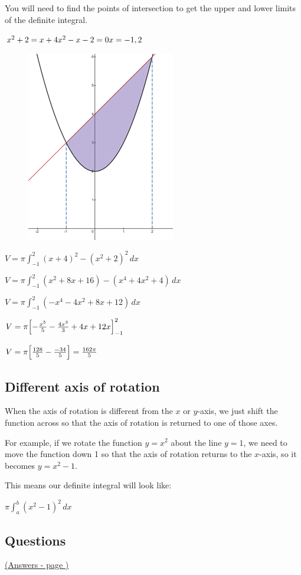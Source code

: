 \documentclass[../main.tex]{subfiles}
\begin{document}
You will need to find the points of intersection to get the upper and lower limits of the definite integral.

$x^2+2=x+4\\
x^2-x-2=0\\
x=-1, 2$

\begin{figure}[h!]
    \centering
    \includegraphics{images/volrev7.png}
\end{figure}

$V=\pi \int_{-1}^2 (x+4)^2 - (x^2+2)^2\,dx$

$V=\pi \int_{-1}^2 (x^2+8x+16) - (x^4+4x^2+4)\,dx$

$V=\pi \int_{-1}^2 (-x^4-4x^2+8x+12)\,dx$

$V=\pi \Bigl[-\frac{x^5}{5}-\frac{4x^3}{3}+4x+12x\Bigr]_{-1}^2$

$V=\pi \Bigl[\frac{128}{5}-\frac{-34}{5} \Bigr]=\frac{162\pi}{5}$

\subsection*{Different axis of rotation}
When the axis of rotation is different from the $x$ or $y$-axis, we just shift the function across so that the axis of rotation is returned to one of those axes.

For example, if we rotate the function $y=x^2$ about the line $y=1$, we need to move the function down 1 so that the axis of rotation returns to the $x$-axis, so it becomes $y=x^2-1$.

This means our definite integral will look like:

$\pi \int_a^b (x^2-1)^2\,dx$

\pagebreak
\hypertarget{volumesofrevolutionlink}{\subsection*{Questions}}
\hyperlink{volumesofrevolutionanswers}{(Answers - page {\pageref*{Volumes of revolution answers}})}
\end{document}
